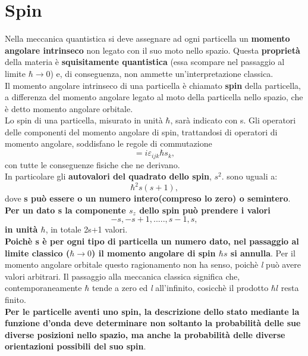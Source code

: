 \chapter{Spin}
Nella meccanica quantistica si deve assegnare ad ogni particella un \textbf{momento angolare intrinseco} non legato con il suo moto nello spazio. Questa \textbf{proprietà} della materia è \textbf{squisitamente quantistica} (essa scompare nel passaggio al limite $\hbar\rightarrow0$) e, di conseguenza, non ammette un'interpretazione classica.\\ Il momento angolare intrinseco di una particella è chiamato \textbf{spin} della particella, a differenza del momento angolare legato al moto della particella nello spazio, che è detto momento angolare orbitale.\\ Lo spin di una particella, misurato in unità $\hbar$, sarà indicato con s. Gli operatori delle componenti del momento angolare di spin, trattandosi di operatori di momento angolare, soddisfano le regole di commutazione
\begin{equation}
[s_{i},s_{j}]=i\varepsilon_{ijk}\hbar s_{k} ,
\label{18.1}
\end{equation}
con tutte le conseguenze fisiche che ne derivano.\\
In particolare gli \textbf{autovalori del quadrato dello spin}, $s^{2}$. sono uguali a:
\begin{equation}
\hbar^{2}s(s+1) ,
\end{equation}
dove \textbf{s può essere o un numero intero(compreso lo zero) o semintero}.\\ \textbf{Per un dato s la componente $s_{z}$ dello spin può prendere i valori}
\begin{equation}
-s, -s+1,.....,s-1,s ,
\end{equation}
\textbf{in unità $\hbar$}, in totale 2s+1 valori.\\ \textbf{Poichè s è per ogni tipo di particella un numero dato, nel passaggio al limite classico ($\hbar\rightarrow0$) il momento angolare di spin $\hbar s$ si annulla}. Per il momento angolare orbitale questo ragionamento non ha senso, poichè \textit{l} può avere valori arbitrari. Il passaggio alla meccanica classica significa che, contemporaneamente $\hbar$ tende a zero ed \textit{l} all'infinito, cosicchè il prodotto $\hbar l$ resta finito.\\ \textbf{Per le particelle aventi uno spin, la descrizione dello stato mediante la funzione d'onda deve determinare non soltanto la probabilità delle sue diverse posizioni nello spazio, ma anche la probabilità delle diverse orientazioni possibili del suo spin}.
